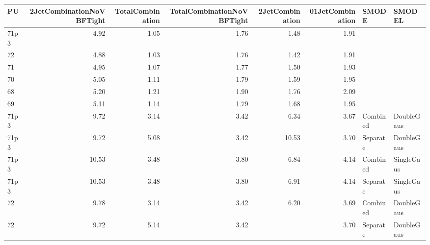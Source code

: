 \documentclass[11pt, letterpaper]{article}
\begin{document}
\fontsize{6}{6}\selectfont
\begin{tabular}{lrrrrrll}
\hline
 PU   &   2JetCombinationNoVBFTight &   TotalCombination &   TotalCombinationNoVBFTight &   2JetCombination &   01JetCombination & SMODE    & SMODEL     \\
\hline
 71p3 &                        4.92 &               1.05 &                         1.76 &              1.48 &               1.91 &          &            \\
 72   &                        4.88 &               1.03 &                         1.76 &              1.42 &               1.91 &          &            \\
 71   &                        4.95 &               1.07 &                         1.77 &              1.50 &               1.93 &          &            \\
 70   &                        5.05 &               1.11 &                         1.79 &              1.59 &               1.95 &          &            \\
 68   &                        5.20 &               1.21 &                         1.90 &              1.76 &               2.09 &          &            \\
 69   &                        5.11 &               1.14 &                         1.79 &              1.68 &               1.95 &          &            \\
 71p3 &                        9.72 &               3.14 &                         3.42 &              6.34 &               3.67 & Combined & DoubleGaus \\
 71p3 &                        9.72 &               5.08 &                         3.42 &             10.53 &               3.70 & Separate & DoubleGaus \\
 71p3 &                       10.53 &               3.48 &                         3.80 &              6.84 &               4.14 & Combined & SingleGaus \\
 71p3 &                       10.53 &               3.48 &                         3.80 &              6.91 &               4.14 & Separate & SingleGaus \\
 72   &                        9.78 &               3.14 &                         3.42 &              6.20 &               3.69 & Combined & DoubleGaus \\
 72   &                        9.72 &               5.14 &                         3.42 &                   &               3.70 & Separate & DoubleGaus \\

\end{tabular}
\end{document}
